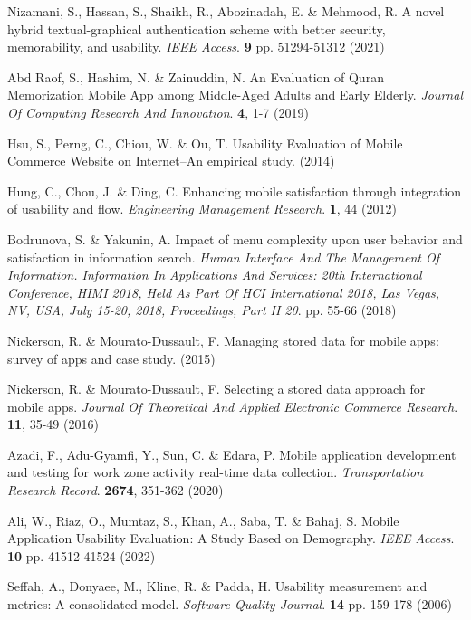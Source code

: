 \documentclass[preprint,12pt]{elsarticle}
\begin{document}
\begin{thebibliography}{99}
Nizamani, S., Hassan, S., Shaikh, R., Abozinadah, E. \& Mehmood, R. A novel hybrid textual-graphical authentication scheme with better security, memorability, and usability. {\em IEEE Access}. \textbf{9} pp. 51294-51312 (2021)

Abd Raof, S., Hashim, N. \& Zainuddin, N. An Evaluation of Quran Memorization Mobile App among Middle-Aged Adults and Early Elderly. {\em Journal Of Computing Research And Innovation}. \textbf{4}, 1-7 (2019)

Hsu, S., Perng, C., Chiou, W. \& Ou, T. Usability Evaluation of Mobile Commerce Website on Internet–An empirical study.  (2014)

Hung, C., Chou, J. \& Ding, C. Enhancing mobile satisfaction through integration of usability and flow. {\em Engineering Management Research}. \textbf{1}, 44 (2012)

Bodrunova, S. \& Yakunin, A. Impact of menu complexity upon user behavior and satisfaction in information search. {\em Human Interface And The Management Of Information. Information In Applications And Services: 20th International Conference, HIMI 2018, Held As Part Of HCI International 2018, Las Vegas, NV, USA, July 15-20, 2018, Proceedings, Part II 20}. pp. 55-66 (2018)

Nickerson, R. \& Mourato-Dussault, F. Managing stored data for mobile apps: survey of apps and case study.  (2015)

Nickerson, R. \& Mourato-Dussault, F. Selecting a stored data approach for mobile apps. {\em Journal Of Theoretical And Applied Electronic Commerce Research}. \textbf{11}, 35-49 (2016)

Azadi, F., Adu-Gyamfi, Y., Sun, C. \& Edara, P. Mobile application development and testing for work zone activity real-time data collection. {\em Transportation Research Record}. \textbf{2674}, 351-362 (2020)

Ali, W., Riaz, O., Mumtaz, S., Khan, A., Saba, T. \& Bahaj, S. Mobile Application Usability Evaluation: A Study Based on Demography. {\em IEEE Access}. \textbf{10} pp. 41512-41524 (2022)

Seffah, A., Donyaee, M., Kline, R. \& Padda, H. Usability measurement and metrics: A consolidated model. {\em Software Quality Journal}. \textbf{14} pp. 159-178 (2006)


\end{thebibliography}
\end{document}
